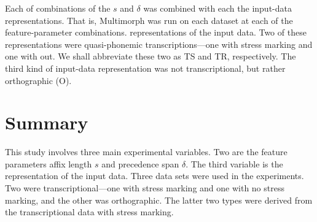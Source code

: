 Each of combinations of the $s$ and $\delta$ was combined with each the input-data representations. That is, Multimorph was run on each dataset at each of the feature-parameter combinations.  representations of the input data. Two of these representations were quasi-phonemic transcriptions---one with stress marking and one with out. We shall abbreviate these two as TS and TR, respectively. The third kind of input-data representation was not transcriptional, but rather orthographic (O). 


\section{Summary}

This study involves three main experimental variables. Two are the feature parameters affix length $s$ and precedence span $\delta$. The third variable is the representation of the input data. Three data sets were used in the experiments. Two were transcriptional---one with stress marking and one with no stress marking, and the other was orthographic. The latter two types were derived from the transcriptional data with stress marking. 


